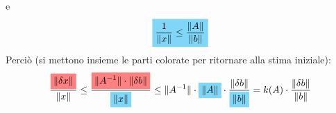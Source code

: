 e
\begin{displaymath}
    \highlightCYAN{\frac{1}{\lVert x \rVert} \leq \frac{\lVert A \rVert}{\lVert b \rVert}}
\end{displaymath}
Perciò (si mettono insieme le parti colorate per ritornare alla stima iniziale):
\begin{displaymath}
    \frac{\highlightRED{\lVert \delta x \rVert }}{\lVert x \rVert } \leq \frac{\highlightRED{\lVert A^{-1} \rVert \cdot \lVert \delta b \rVert }}{\highlightCYAN{\lVert x \rVert }} \leq \lVert A^{-1} \rVert  \cdot \highlightCYAN{\lVert A \rVert} \cdot \frac{\lVert \delta b \rVert }{\highlightCYAN{\lVert b \rVert }} = k(A)\cdot \frac{\lVert \delta b \rVert }{\lVert b \rVert }
\end{displaymath}